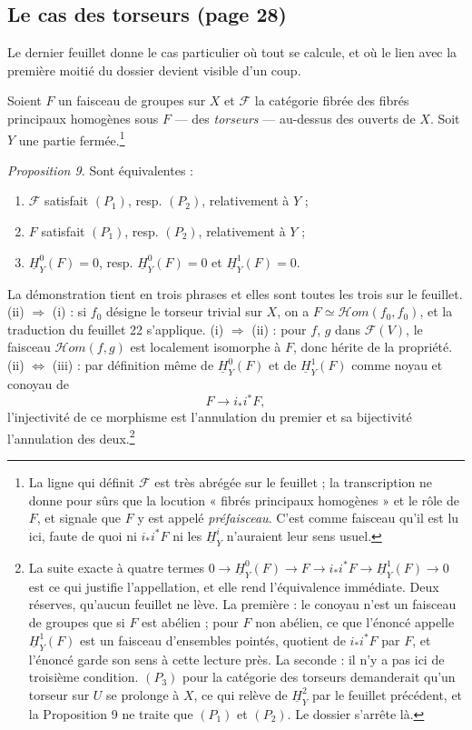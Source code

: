\documentclass[11pt,a4paper]{article}
\begin{document}
\subsection*{Le cas des torseurs (page 28)}

Le dernier feuillet donne le cas particulier où tout se calcule, et où le lien
avec la première moitié du dossier devient visible d'un coup.

Soient $F$ un faisceau de groupes sur $X$ et $\mathcal{F}$ la catégorie fibrée
des fibrés principaux homogènes sous $F$ — des \emph{torseurs} — au-dessus des
ouverts de $X$. Soit $Y$ une partie fermée.\footnote{La ligne qui définit
$\mathcal{F}$ est très abrégée sur le feuillet ; la transcription ne donne pour
sûrs que la locution « fibrés principaux homogènes » et le rôle de $F$, et
signale que $F$ y est appelé \emph{préfaisceau}. C'est comme faisceau qu'il est
lu ici, faute de quoi ni $i_{*}i^{*}F$ ni les $\underline{H}^{i}_{Y}$ n'auraient
leur sens usuel.}

\emph{Proposition 9.} Sont équivalentes :
\begin{enumerate}
  \item[(i)] $\mathcal{F}$ satisfait $(P_{1})$, resp. $(P_{2})$, relativement à
  $Y$ ;
  \item[(ii)] $F$ satisfait $(P_{1})$, resp. $(P_{2})$, relativement à $Y$ ;
  \item[(iii)] $\underline{H}^{0}_{Y}(F) = 0$, resp.
  $\underline{H}^{0}_{Y}(F) = 0$ et $\underline{H}^{1}_{Y}(F) = 0$.
\end{enumerate}

La démonstration tient en trois phrases et elles sont toutes les trois sur le
feuillet. (ii) $\Rightarrow$ (i) : si $f_{0}$ désigne le torseur trivial sur
$X$, on a $F \simeq \mathcal{H}om(f_{0}, f_{0})$, et la traduction du feuillet 22
s'applique. (i) $\Rightarrow$ (ii) : pour $f$, $g$ dans $\mathcal{F}(V)$, le
faisceau $\mathcal{H}om(f,g)$ est localement isomorphe à $F$, donc hérite de la
propriété. (ii) $\Leftrightarrow$ (iii) : par définition même de
$\underline{H}^{0}_{Y}(F)$ et de $\underline{H}^{1}_{Y}(F)$ comme noyau et
conoyau de
\[
  F \longrightarrow i_{*}i^{*}F ,
\]
l'injectivité de ce morphisme est l'annulation du premier et sa bijectivité
l'annulation des deux.\footnote{La suite exacte à quatre termes
$0 \to \underline{H}^{0}_{Y}(F) \to F \to i_{*}i^{*}F \to
\underline{H}^{1}_{Y}(F) \to 0$ est ce qui justifie l'appellation, et elle rend
l'équivalence immédiate. Deux réserves, qu'aucun feuillet ne lève. La première :
le conoyau n'est un faisceau de groupes que si $F$ est abélien ; pour $F$ non
abélien, ce que l'énoncé appelle $\underline{H}^{1}_{Y}(F)$ est un faisceau
d'ensembles pointés, quotient de $i_{*}i^{*}F$ par $F$, et l'énoncé garde son
sens à cette lecture près. La seconde : il n'y a pas ici de troisième condition.
$(P_{3})$ pour la catégorie des torseurs demanderait qu'un torseur sur $U$ se
prolonge à $X$, ce qui relève de $\underline{H}^{2}_{Y}$ par le feuillet
précédent, et la Proposition 9 ne traite que $(P_{1})$ et $(P_{2})$. Le dossier
s'arrête là.}
\end{document}
